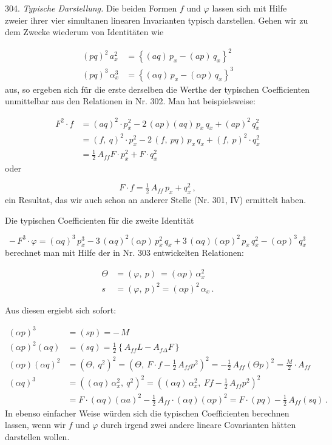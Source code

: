 304. \textit{Typische Darstellung.} Die beiden Formen $f$ und $\varphi$
lassen sich mit Hilfe zweier ihrer vier simultanen linearen Invarianten
typisch darstellen. Gehen wir zu dem Zwecke wiederum von Identitäten wie

\[
\begin{aligned}
(pq)^2\,a_x^2 &= \left\{(aq)\,p_x - (ap)\,q_x\right\}^2\\
(pq)^3\,\alpha_x^3 &= \left\{(\alpha q)\,p_x - (\alpha p)\,q_x\right\}^3
\end{aligned}
\]
aus, so ergeben sich für die erste derselben die Werthe der typischen
Coefficienten unmittelbar aus den Relationen in Nr. 302. Man hat
beispielsweise:

\[
\begin{aligned}
F^2\cdot f &= (aq)^2\cdot p_x^2 - 2\,(ap)(aq)\,p_x\,q_x + (ap)^2\,q_x^2\\
&= (f,\ q)^2\cdot p_x^2 - 2\,(f,\ pq)\,p_x\,q_x + (f,\ p)^2\cdot q_x^2\\
&= \tfrac{1}{2}\,A_{ff}F\cdot p_x^2 + F\cdot q_x^2
\end{aligned}
\]
oder

\[
F\cdot f = \tfrac{1}{2}\,A_{ff}\,p_x + q_x^2\,,
\]
ein Resultat, das wir auch schon an anderer Stelle (Nr. 301, IV) ermittelt
haben.

Die typischen Coefficienten für die zweite Identität

\[
-\,F^3\cdot\varphi = (\alpha q)^3\,p_x^3 - 3\,(\alpha q)^2(\alpha p)\,p_x^2\,q_x + 3\,(\alpha q)(\alpha p)^2\,p_x\,q_x^2 - (\alpha p)^3\,q_x^3
\]
berechnet man mit Hilfe der in Nr. 303 entwickelten Relationen:

\[
\begin{aligned}
\Theta &= (\varphi,\ p)\ = (\alpha p)\,\alpha_x^2\\
s &= (\varphi,\ p)^2 = (\alpha p)^2\,\alpha_x\,.
\end{aligned}
\]


Aus diesen ergiebt sich sofort:

\[
\begin{aligned}
(\alpha p)^3 &= (sp) = -\,M\\
(\alpha p)^2(\alpha q) &= (sq) = \tfrac{1}{2}\left\{A_{ff}L - A_{f\Delta}F\right\}\\
(\alpha p)(\alpha q)^2 &= (\Theta,\ q^2)^2 = \left(\Theta,\ F\cdot f - \tfrac{1}{2}\,A_{ff}p^2\right)^2 = -\tfrac{1}{2}\,A_{ff}(\Theta p)^2 = \tfrac{M}{2}\cdot A_{ff}\\
(\alpha q)^3 &= \left((\alpha q)\,\alpha_x^2,\ q^2\right)^2 = \left((\alpha q)\,\alpha_x^2,\ Ff - \tfrac{1}{2}\,A_{ff}p^2\right)^2\\
&= F\cdot(\alpha q)(\alpha a)^2 - \tfrac{1}{2}\,A_{ff}\cdot(\alpha q)(\alpha p)^2 = F\cdot(pq) - \tfrac{1}{2}\,A_{ff}(sq)\,.
\end{aligned}
\]
In ebenso einfacher Weise würden sich die typischen Coefficienten
berechnen lassen, wenn wir $f$ und $\varphi$ durch irgend zwei andere
lineare Covarianten hätten darstellen wollen.


